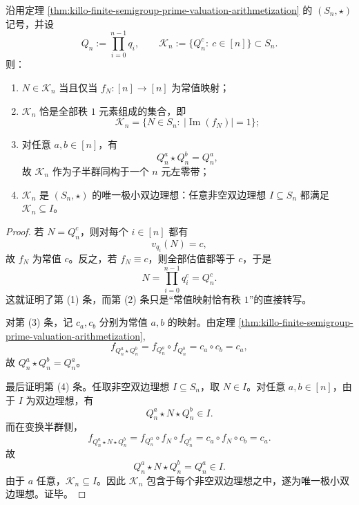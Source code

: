 \begin{theorem}[素数寄存器半群的唯一极小双边理想与左零带结构]\label{thm:xi-prime-register-minimal-ideal-left-zero-band}
沿用定理 \ref{thm:killo-finite-semigroup-prime-valuation-arithmetization} 的 \((S_n,\star)\) 记号，并设
\[
Q_n:=\prod_{i=0}^{n-1}q_i,
\qquad
\mathcal K_n:=\{Q_n^c:\ c\in[n]\}\subset S_n.
\]
则：
\begin{enumerate}
  \item \(N\in \mathcal K_n\) 当且仅当 \(f_N:[n]\to[n]\) 为常值映射；
  \item \(\mathcal K_n\) 恰是全部秩 \(1\) 元素组成的集合，即
  \[
  \mathcal K_n=\{N\in S_n:\ |\operatorname{Im}(f_N)|=1\};
  \]
  \item 对任意 \(a,b\in[n]\)，有
  \[
  \boxed{\;
  Q_n^a\star Q_n^b=Q_n^a,
  \;}
  \]
  故 \(\mathcal K_n\) 作为子半群同构于一个 \(n\) 元左零带；
  \item \(\mathcal K_n\) 是 \((S_n,\star)\) 的唯一极小双边理想：任意非空双边理想 \(I\subseteq S_n\) 都满足 \(\mathcal K_n\subseteq I\)。
\end{enumerate}
\end{theorem}
\begin{proof}
若 \(N=Q_n^c\)，则对每个 \(i\in[n]\) 都有
\[
v_{q_i}(N)=c,
\]
故 \(f_N\) 为常值 \(c\)。反之，若 \(f_N\equiv c\)，则全部估值都等于 \(c\)，于是
\[
N=\prod_{i=0}^{n-1}q_i^c=Q_n^c.
\]
这就证明了第 (1) 条，而第 (2) 条只是“常值映射恰有秩 \(1\)”的直接转写。

对第 (3) 条，记 \(c_a,c_b\) 分别为常值 \(a,b\) 的映射。由定理 \ref{thm:killo-finite-semigroup-prime-valuation-arithmetization},
\[
f_{Q_n^a\star Q_n^b}=f_{Q_n^a}\circ f_{Q_n^b}=c_a\circ c_b=c_a,
\]
故 \(Q_n^a\star Q_n^b=Q_n^a\)。

最后证明第 (4) 条。任取非空双边理想 \(I\subseteq S_n\)，取 \(N\in I\)。对任意 \(a,b\in[n]\)，由于 \(I\) 为双边理想，有
\[
Q_n^a\star N\star Q_n^b\in I.
\]
而在变换半群侧，
\[
f_{Q_n^a\star N\star Q_n^b}
=
f_{Q_n^a}\circ f_N\circ f_{Q_n^b}
=
c_a\circ f_N\circ c_b
=
c_a.
\]
故
\[
Q_n^a\star N\star Q_n^b=Q_n^a\in I.
\]
由于 \(a\) 任意，\(\mathcal K_n\subseteq I\)。因此 \(\mathcal K_n\) 包含于每个非空双边理想之中，遂为唯一极小双边理想。证毕。
\end{proof}

